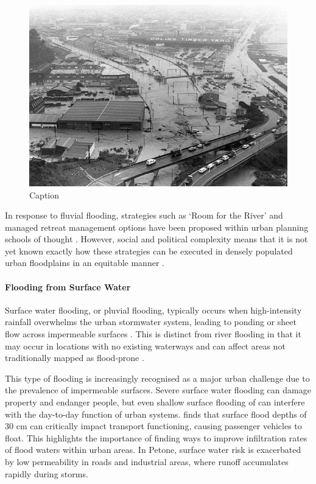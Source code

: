 \begin{figure}
    \centering
    \includegraphics[width=1\linewidth]{Content/Figures/02_Literature_Review/1978flood.jpg}
    \caption{Caption}
    \label{fig:1978flood}
\end{figure}

In response to fluvial flooding, strategies such as ‘Room for the River’ and
managed retreat management options have been proposed within urban planning
schools of thought \parencite{brierley2023, lawrence2020}. However, social and
political complexity means that it is not yet known exactly how these strategies
can be executed in densely populated urban floodplains in an equitable manner
\parencite{hanna2022re, pawson2025}.

\paragraph{Flooding from Surface Water}
Surface water flooding, or pluvial flooding, typically occurs when
high-intensity rainfall overwhelms the urban stormwater system, leading to
ponding or sheet flow across impermeable surfaces \parencite{Seybert2007,
li2020}. This is distinct from river flooding in that it may occur in locations
with no existing waterways and can affect areas not traditionally mapped as
flood-prone \parencite{Pozo2023, Smart2010}.

This type of flooding is increasingly recognised as a major urban challenge due
to the prevalence of impermeable surfaces. Severe surface water flooding can
damage property and endanger people, but even shallow surface flooding of can
interfere with the day-to-day function of urban systems.
\textcite{pregnolato2017} finds that surface flood depths of 30 cm can
critically impact transport functioning, causing passenger vehicles to float.
This highlights the importance of finding ways to improve infiltration rates of
flood waters within urban areas. In Petone, surface water risk is exacerbated by
low permeability in roads and industrial areas, where runoff accumulates rapidly
during storms.

